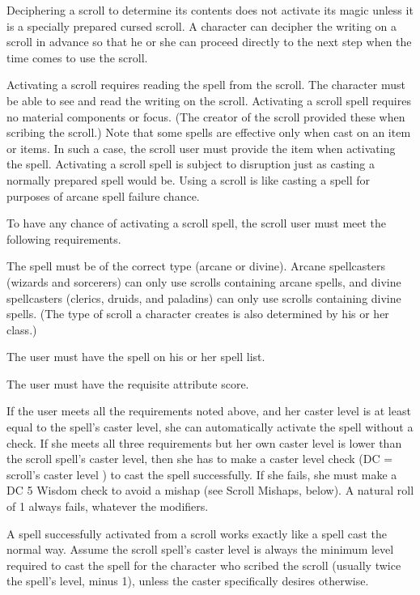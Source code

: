 Deciphering a scroll to determine its contents does not activate its magic unless it is a specially prepared cursed scroll. A character can decipher the writing on a scroll in advance so that he or she can proceed directly to the next step when the time comes to use the scroll.

 Activating a scroll requires reading the spell from the scroll. The character must be able to see and read the writing on the scroll. Activating a scroll spell requires no material components or focus. (The creator of the scroll provided these when scribing the scroll.) Note that some spells are effective only when cast on an item or items. In such a case, the scroll user must provide the item when activating the spell. Activating a scroll spell is subject to disruption just as casting a normally prepared spell would be. Using a scroll is like casting a spell for purposes of arcane spell failure chance.

To have any chance of activating a scroll spell, the scroll user must meet the following requirements.
\begin{itemize*}
\item The spell must be of the correct type (arcane or divine). Arcane spellcasters (wizards and sorcerers) can only use scrolls containing arcane spells, and divine spellcasters (clerics, druids, and paladins) can only use scrolls containing divine spells. (The type of scroll a character creates is also determined by his or her class.)
\item The user must have the spell on his or her spell list.
\item The user must have the requisite attribute score.
\end{itemize*}

If the user meets all the requirements noted above, and her caster level is at least equal to the spell's caster level, she can automatically activate the spell without a check. If she meets all three requirements but her own caster level is lower than the scroll spell's caster level, then she has to make a caster level check (DC = scroll's caster level ) to cast the spell successfully. If she fails, she must make a DC 5 Wisdom check to avoid a mishap (see Scroll Mishaps, below). A natural roll of 1 always fails, whatever the modifiers.

 A spell successfully activated from a scroll works exactly like a spell cast the normal way. Assume the scroll spell's caster level is always the minimum level required to cast the spell for the character who scribed the scroll (usually twice the spell's level, minus 1), unless the caster specifically desires otherwise.

